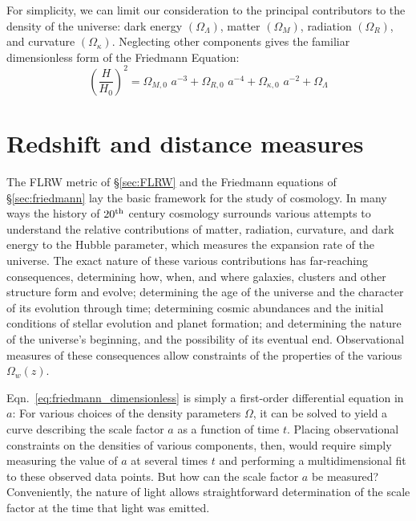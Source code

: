 For simplicity, we can limit our consideration to the principal contributors
to the density of the universe:
dark energy $(\Omega_\Lambda)$, matter $(\Omega_M)$, radiation $(\Omega_R)$,
and curvature $(\Omega_\kappa)$.  Neglecting other components gives the
familiar dimensionless form of the Friedmann Equation:
\begin{equation}
  \label{eq:friedmann_dimensionless}
  \left(\frac{H}{H_0}\right)^2
  = \Omega_{M,0}\,\,a^{-3} + \Omega_{R,0}\,\,a^{-4}
  + \Omega_{\kappa,0}\,\,a^{-2} + \Omega_\Lambda
\end{equation}

\section{Redshift and distance measures}
\label{sec:redshift}
The FLRW metric of \S\ref{sec:FLRW} and the Friedmann equations of
\S\ref{sec:friedmann} lay the basic framework for the study of cosmology.
In many ways the history of $20^{\rm th}$ century cosmology surrounds various
attempts to understand the relative contributions of matter, radiation,
curvature, and dark energy to the Hubble parameter, which measures
the expansion rate of the universe.  The exact nature of these various
contributions has far-reaching consequences,
determining how, when, and where galaxies, clusters and other structure
form and evolve; determining the age of the universe and the character of
its evolution through time; determining cosmic abundances and 
the initial conditions of stellar evolution
and planet formation; and determining the nature of the universe's beginning,
and the possibility of its eventual end.
Observational measures of these consequences allow constraints of the
properties of the various $\Omega_w(z)$.

Eqn.~\ref{eq:friedmann_dimensionless} is simply a first-order differential
equation in $a$: For various choices of the density parameters $\Omega$, it
can be solved to yield a curve describing the scale factor $a$ as a function
of time $t$.  Placing observational constraints on the densities of
various components, then, would require simply measuring the value of $a$ at
several times $t$ and performing a multidimensional fit to these observed
data points.  But how can the scale factor $a$ be measured?
Conveniently, the nature of light allows straightforward determination
of the scale factor at the time that light was emitted.  

